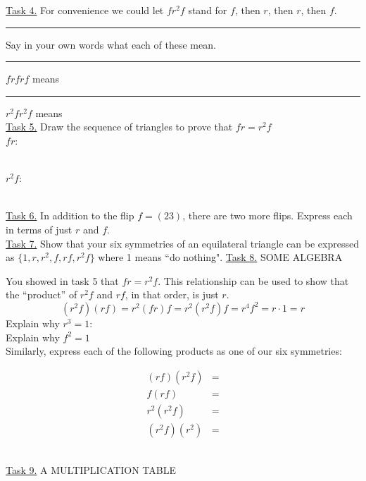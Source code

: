 \documentclass[12pt]{article}
\theoremstyle{definition}
\begin{document}
\newpage%
\underline{Task 4.}  For convenience we could let $fr^2f$ stand for $f$, then $r$, then $r$, then $f$.\\
\rule{.8in}{0in}Say in your own words what each of these mean.\\
\rule{.8in}{0in}$frfrf$ means\\[.25in]
\rule{.8in}{0in}$r^2fr^2f$ means\\[.25in]
\underline{Task 5.}  Draw the sequence of triangles to prove that $fr=r^2f$\\
$fr$\quad: \begin{minipage}{3.75in}\def\svgwidth{1.75in}\end{minipage}\\[.1in]
$r^2f$\quad: \begin{minipage}{3.75in}\def\svgwidth{1.75in}\end{minipage}\\[.1in]
\underline{Task 6.}  In addition to the flip $f=(23)$, there are two more flips.  Express each in terms of just $r$ and $f$.\\
\vfill
\underline{Task 7.}   Show that your six symmetries of an equilateral triangle can be expressed as $\{1, r, r^2, f, rf, r^2f\}$ where 1 means ``do nothing".%
\vfill%
\vfill
\newpage%
\underline{Task 8.}  SOME ALGEBRA

You showed in task 5 that $fr=r^2f$.  This relationship can be used to show that the ``product'' of $r^2f$ and $rf$, in that order, is just $r$.
$$(r^2f)(rf)=r^2(fr)f=r^2(r^2f)f=r^4f^2=r\cdot 1 =r$$
Explain why $r^3=1$:\\[.1in]
Explain why $f^2=1$\\[.1in]
Similarly, express each of the following products as one of our six symmetries:\\
\begin{minipage}{1.5in}\begin{equation*}\begin{split}
(rf)(r^2f) &=\\
f(rf)&=\\
r^2(r^2f)&=\\
(r^2f)(r^2) &=
\end{split}\end{equation*}\end{minipage}\\[.1in]
\underline{Task 9.}  A MULTIPLICATION TABLE
\end{document}

